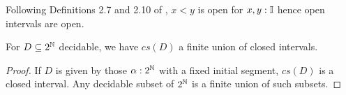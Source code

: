 %
%
%
\begin{remark}
  Following Definitions 2.7 and 2.10 of \cite{Bishop},  $x<y$ is open for $x,y:\mathbb{I}$ hence open intervals are open. 
\end{remark}
%
\begin{lemma}\label{ImageDecidableClosedInterval}
  For $D\subseteq 2^{\mathbb{N}}$ decidable, we have $cs(D)$ a finite union of closed intervals. 
\end{lemma}
\begin{proof}
  If $D$ is given by those $\alpha:2^{\mathbb{N}}$ with a fixed initial segment, $cs(D)$ is a closed interval. 
  Any decidable subset of $2^{\mathbb{N}}$ is a finite union of such subsets. 
\end{proof}
